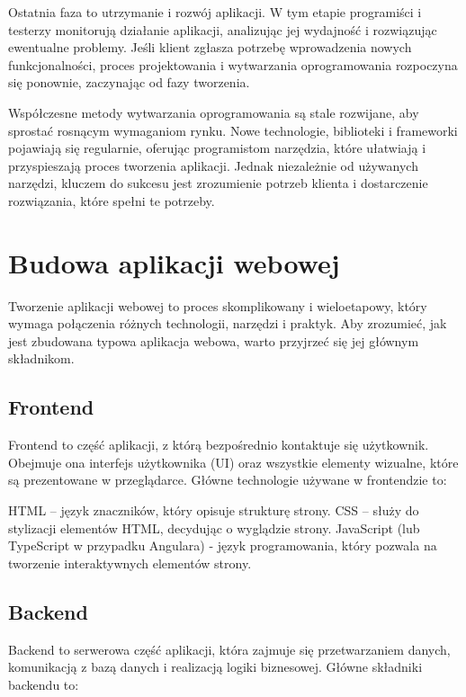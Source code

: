Ostatnia faza to utrzymanie i rozwój aplikacji. W tym etapie programiści i testerzy monitorują działanie aplikacji, analizując jej wydajność i rozwiązując ewentualne problemy. Jeśli klient zgłasza potrzebę wprowadzenia nowych funkcjonalności, proces projektowania i wytwarzania oprogramowania rozpoczyna się ponownie, zaczynając od fazy tworzenia.

Współczesne metody wytwarzania oprogramowania są stale rozwijane, aby sprostać rosnącym wymaganiom rynku. Nowe technologie, biblioteki i frameworki pojawiają się regularnie, oferując programistom narzędzia, które ułatwiają i przyspieszają proces tworzenia aplikacji. Jednak niezależnie od używanych narzędzi, kluczem do sukcesu jest zrozumienie potrzeb klienta i dostarczenie rozwiązania, które spełni te potrzeby.


\section{Budowa aplikacji webowej}

Tworzenie aplikacji webowej to proces skomplikowany i wieloetapowy, który wymaga połączenia różnych technologii, narzędzi i praktyk. Aby zrozumieć, jak jest zbudowana typowa aplikacja webowa, warto przyjrzeć się jej głównym składnikom.
\cite{budowaAplikacji}

\subsection{Frontend}

Frontend to część aplikacji, z którą bezpośrednio kontaktuje się użytkownik. Obejmuje ona interfejs użytkownika (UI) oraz wszystkie elementy wizualne, które są prezentowane w przeglądarce. Główne technologie używane w frontendzie to:

HTML -- język znaczników, który opisuje strukturę strony.
CSS -- służy do stylizacji elementów HTML, decydując o wyglądzie strony.
JavaScript (lub TypeScript w przypadku Angulara) - język programowania, który pozwala na tworzenie interaktywnych elementów strony.

\subsection{Backend}

Backend to serwerowa część aplikacji, która zajmuje się przetwarzaniem danych, komunikacją z bazą danych i realizacją logiki biznesowej. Główne składniki backendu to:


